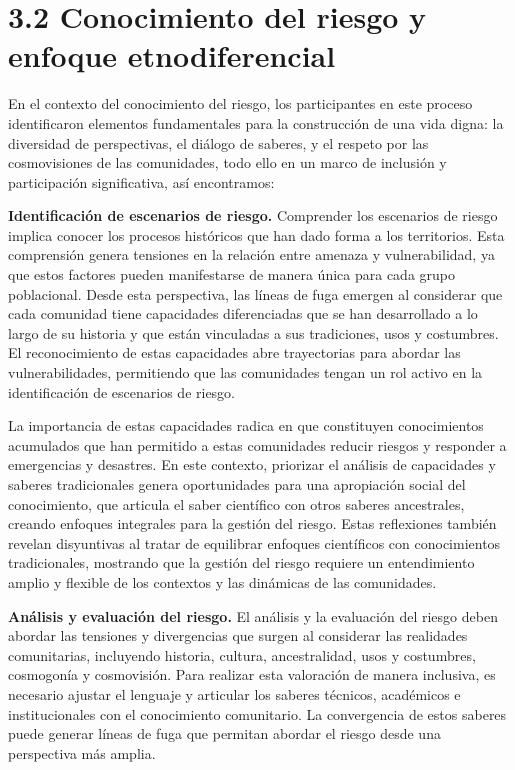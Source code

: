\documentclass[
  spanish,
  letterpaper,
]{book}
\begin{document}
\section{3.2 Conocimiento del riesgo y enfoque
etnodiferencial}\label{conocimiento-del-riesgo-y-enfoque-etnodiferencial}

En el contexto del conocimiento del riesgo, los participantes en este
proceso identificaron elementos fundamentales para la construcción de
una vida digna: la diversidad de perspectivas, el diálogo de saberes, y
el respeto por las cosmovisiones de las comunidades, todo ello en un
marco de inclusión y participación significativa, así encontramos:

\textbf{Identificación de escenarios de riesgo.} Comprender los
escenarios de riesgo implica conocer los procesos históricos que han
dado forma a los territorios. Esta comprensión genera tensiones en la
relación entre amenaza y vulnerabilidad, ya que estos factores pueden
manifestarse de manera única para cada grupo poblacional. Desde esta
perspectiva, las líneas de fuga emergen al considerar que cada comunidad
tiene capacidades diferenciadas que se han desarrollado a lo largo de su
historia y que están vinculadas a sus tradiciones, usos y costumbres. El
reconocimiento de estas capacidades abre trayectorias para abordar las
vulnerabilidades, permitiendo que las comunidades tengan un rol activo
en la identificación de escenarios de riesgo.

La importancia de estas capacidades radica en que constituyen
conocimientos acumulados que han permitido a estas comunidades reducir
riesgos y responder a emergencias y desastres. En este contexto,
priorizar el análisis de capacidades y saberes tradicionales genera
oportunidades para una apropiación social del conocimiento, que articula
el saber científico con otros saberes ancestrales, creando enfoques
integrales para la gestión del riesgo. Estas reflexiones también revelan
disyuntivas al tratar de equilibrar enfoques científicos con
conocimientos tradicionales, mostrando que la gestión del riesgo
requiere un entendimiento amplio y flexible de los contextos y las
dinámicas de las comunidades.

\textbf{Análisis y evaluación del riesgo.} El análisis y la evaluación
del riesgo deben abordar las tensiones y divergencias que surgen al
considerar las realidades comunitarias, incluyendo historia, cultura,
ancestralidad, usos y costumbres, cosmogonía y cosmovisión. Para
realizar esta valoración de manera inclusiva, es necesario ajustar el
lenguaje y articular los saberes técnicos, académicos e institucionales
con el conocimiento comunitario. La convergencia de estos saberes puede
generar líneas de fuga que permitan abordar el riesgo desde una
perspectiva más amplia.
\end{document}
